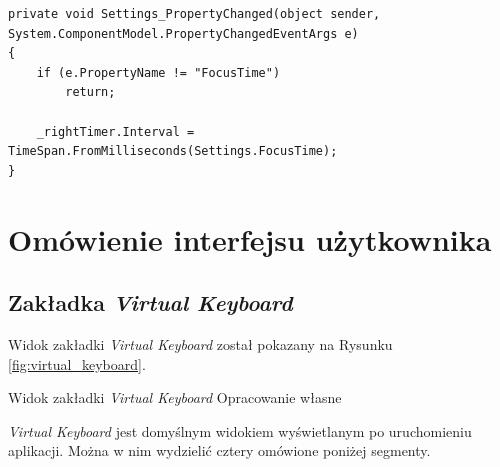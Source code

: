 \documentclass[skorowidz,skroty]{dyplomWEZUT}
\begin{document}
\vfill

\begin{lstlisting}[language={[Sharp]C}]
private void Settings_PropertyChanged(object sender, System.ComponentModel.PropertyChangedEventArgs e)
{
    if (e.PropertyName != "FocusTime")
        return;

    _rightTimer.Interval = TimeSpan.FromMilliseconds(Settings.FocusTime);
}
\end{lstlisting}

\vfill


\section{Omówienie interfejsu użytkownika}
\subsection{Zakładka \textit{Virtual Keyboard}\label{subsec:virtualkeyboard}}
Widok zakładki \textit{Virtual Keyboard} został pokazany na Rysunku \vref{fig:virtual_keyboard}.

{Widok zakładki \textit{Virtual Keyboard}\label{fig:virtual_keyboard}}
{Opracowanie własne}

\textit{Virtual Keyboard} jest domyślnym widokiem wyświetlanym po uruchomieniu aplikacji. Można w nim wydzielić cztery omówione poniżej segmenty.
\end{document}
